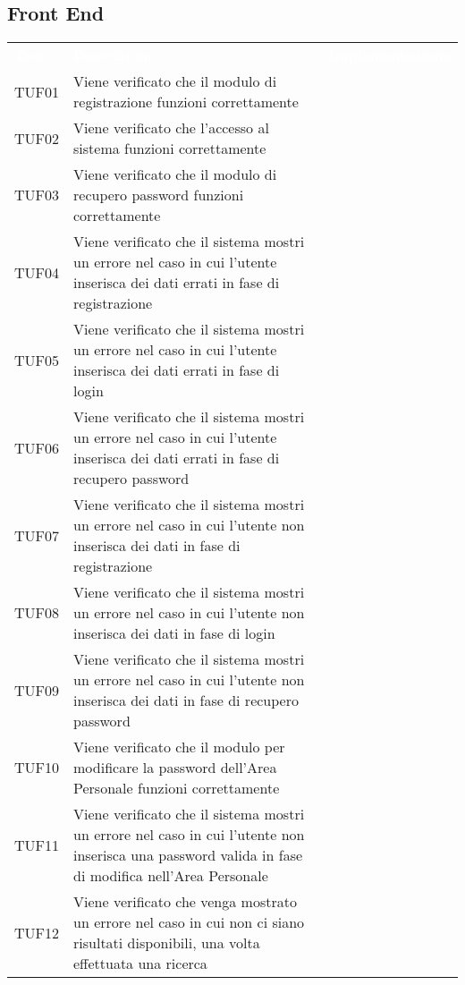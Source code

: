 \subsection{Front End}
\renewcommand{\arraystretch}{1.5}
\begin{longtable}{ m{}<{\centering}  m{}<{\centering}  m{}<{\centering} }
	\rowcolor{darkblue}
	\textcolor{white}{\textbf{Test}} &\textcolor{white}{\textbf{Descrizione}} & \textcolor{white}{\textbf{Implementazione}} \\ 

	TUF01 & Viene verificato che il modulo di registrazione funzioni correttamente & \Ni \\
	TUF02 & Viene verificato che l'accesso al sistema funzioni correttamente & \Ni \\
	TUF03 & Viene verificato che il modulo di recupero password funzioni correttamente & \Ni \\
	TUF04 & Viene verificato che il sistema mostri un errore nel caso in cui l'utente inserisca dei dati errati in fase di registrazione & \Ni \\
	TUF05 & Viene verificato che il sistema mostri un errore nel caso in cui l'utente inserisca dei dati errati in fase di login & \Ni \\
	TUF06 & Viene verificato che il sistema mostri un errore nel caso in cui l'utente inserisca dei dati errati in fase di recupero password & \Ni \\
	TUF07 & Viene verificato che il sistema mostri un errore nel caso in cui l'utente non inserisca dei dati in fase di registrazione & \Ni \\
	TUF08 & Viene verificato che il sistema mostri un errore nel caso in cui l'utente non inserisca dei dati in fase di login & \Ni \\
	TUF09 & Viene verificato che il sistema mostri un errore nel caso in cui l'utente non inserisca dei dati in fase di recupero password & \Ni \\
	TUF10 & Viene verificato che il modulo per modificare la password dell'Area Personale funzioni correttamente & \Ni \\
	TUF11 & Viene verificato che il sistema mostri un errore nel caso in cui l'utente non inserisca una password valida in fase di modifica nell'Area Personale & \Ni \\
	TUF12 & Viene verificato che venga mostrato un errore nel caso in cui non ci siano risultati disponibili, una volta effettuata una ricerca & \Ni \\

\end{longtable}
